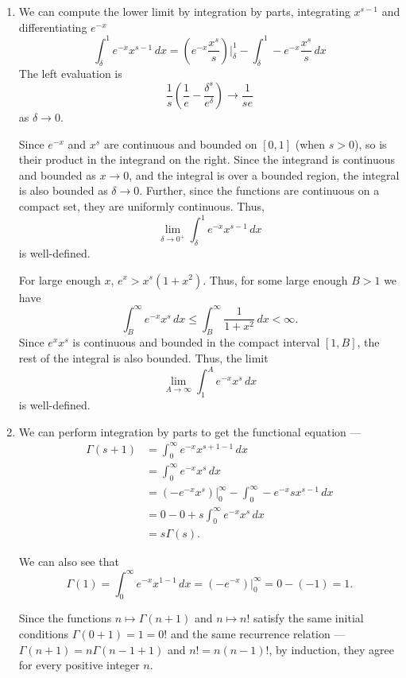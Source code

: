 \documentclass[12 pt, letterpaper]{hmcpset}
\begin{document}
\begin{solution}
	\begin{enumerate}
		\item We can compute the lower limit by integration by parts, integrating $x^{s - 1}$ and differentiating $e^{-x}$
			\[
				\int_{\delta}^{1} e^{-x} x^{s - 1} \, dx = \left ( e^{-x} \frac{x^{s}}{s} \right ) \Big |_{\delta}^{1} - \int_{\delta}^{1} - e^{-x} \frac{x^{s}}{s} \, dx
			\]
			The left evaluation is
			\[
				\frac{1}{s} \left ( \frac{1}{e} - \frac{\delta^{s}}{e^{\delta}} \right ) \to \frac{1}{s e}
			\]
			as $\delta \to 0$.
			
			Since $e^{-x}$ and $x^{s}$ are continuous and bounded on $[0, 1]$ (when $s > 0$), so is their product in the integrand on the right. Since the integrand is continuous and bounded as $x \to 0$, and the integral is over a bounded region, the integral is also bounded as $\delta \to 0$. Further, since the functions are continuous on a compact set, they are uniformly continuous. Thus,
			\[
				\lim_{\delta \to 0^{+}} \int_{\delta}^{1} e^{-x} x^{s - 1} \, dx 
			\]
			is well-defined.

			For large enough $x$, $e^{x} > x^{s}(1 + x^{2})$. Thus, for some large enough $B > 1$ we have
			\[
				\int_{B}^{\infty} e^{-x} x^{s} \, dx \le \int_{B}^{\infty} \frac{1}{1 + x^{2}} \, dx < \infty.
			\]
			Since $e^{x} x^{s}$ is continuous and bounded in the compact interval $[1, B]$, the rest of the integral is also bounded. Thus, the limit
			\[
				\lim_{A \to \infty} \int_{1}^{A} e^{-x} x^{s} \, dx 
			\]
			is well-defined.
			
		\item We can perform integration by parts to get the functional equation ---
			\begin{align*}
				\Gamma(s + 1) & = \int_{0}^{\infty} e^{-x} x^{s + 1 - 1} \, dx \\
					      & = \int_{0}^{\infty} e^{-x} x^{s} \, dx \\
					      & = (-e^{-x} x^{s}) \Big |_{0}^{\infty} - \int_{0}^{\infty} - e^{-x} s x^{s - 1} \, dx \\
					      & = 0 - 0 + s \int_{0}^{\infty} e^{-x} x^{s} \, dx \\
					      & = s \Gamma(s).
			\end{align*}

			We can also see that
			\[
				\Gamma(1) = \int_{0}^{\infty} e^{-x} x^{1 - 1} \, dx = (- e^{-x}) \Big |_{0}^{\infty} = 0 - (-1) = 1.
			\]

			Since the functions $n \mapsto \Gamma(n + 1)$ and $n \mapsto n!$ satisfy the same initial conditions $\Gamma(0 + 1) = 1 = 0!$ and the same recurrence relation --- $\Gamma(n + 1) = n \Gamma(n - 1 + 1)$ and $n! = n (n - 1)!$, by induction, they agree for every positive integer $n$.


\end{enumerate}
\end{solution}
\end{document}
